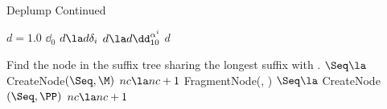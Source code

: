 \begin{algorithm}
    \caption{Deplump Continued}
    \begin{algorithmic}[1]
    


%		
%		
	
		\State $d = 1.0$
		\If{\N = [ ]}
			\State \Return $\dd_0$
		\EndIf
				\State $d \la d \delta_i$ 
			\Else
				\State $d \la d \dd_{10}^{\alpha^i}$
			\EndIf
		\EndFor
		\State \Return $d$
	\EndFunction
    
		\State Find the node \M \space in the suffix tree sharing the longest suffix with \Seq.
			\If{$\Seq = \M$}
				\State \Return \M
			\Else
				\State $\Seq \la$ CreateNode$(\Seq, \M)$
				\State $nc \la nc + 1$
				\State \Return \Seq
			\EndIf
		\Else
			\State \PP \la \space FragmentNode(\M, \Seq)
			\State $\Seq \la $ CreateNode$(\Seq, \PP)$
			\State $nc \la nc + 1$
			\State \Return \Seq
		\EndIf
	\EndFunction
    
    	    \end{algorithmic}
\end{algorithm}

